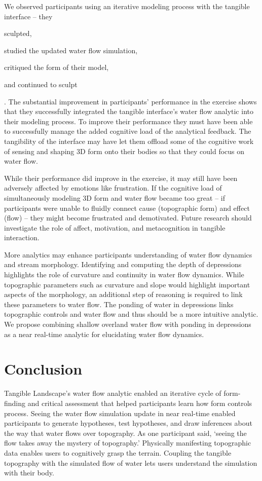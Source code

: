 \documentclass{isprs}
\begin{document}
We observed participants using an iterative modeling process with the tangible interface -- 
they 
\begin{enumerate*}[label=\alph*),font=\itshape]
\item sculpted, 
\item studied the updated water flow simulation, 
\item critiqued the form of their model, 
\item and continued to sculpt
\end{enumerate*}.
%
The substantial improvement in participants' performance in the  exercise
shows that they successfully integrated the tangible interface's water flow analytic 
into their modeling process. 
%
To improve their performance they must have been able to successfully manage the added cognitive load of the analytical feedback. 
%
The tangibility of the interface may have let them offload some of the cognitive work of sensing and shaping 3D form onto their bodies
so that they could focus on water flow. 

While their performance did improve in the  exercise, it may still have been adversely affected by emotions like frustration. 
%
If the cognitive load of simultaneously modeling 3D form and water flow became too great
-- if participants were unable to fluidly connect cause (topographic form) and effect (flow) --
they might become frustrated and demotivated. 
%
Future research should investigate the role of affect, motivation, and metacognition in tangible interaction.

More analytics may enhance participants understanding of water flow dynamics and stream morphology. 
%
Identifying and computing the depth of depressions highlights the role of curvature and continuity in water flow dynamics. 
%
While topographic parameters such as curvature and slope would highlight important aspects of the morphology, 
an additional step of reasoning is required to link these parameters to water flow. 
%
The ponding of water in depressions links topographic controls and water flow 
and thus should be a more intuitive analytic. 
%
We propose combining shallow overland water flow with ponding in depressions
as a near real-time analytic
for elucidating water flow dynamics. 

\section{Conclusion}\label{sec:conclusion}
%
Tangible Landscape's water flow analytic enabled an iterative cycle of form-finding and critical assessment that helped participants learn how form controls process. 
%
Seeing the water flow simulation update in near real-time 
enabled participants to generate hypotheses, test hypotheses, and draw inferences 
about the way that water flows over topography. 
%
As one participant said, `seeing the flow takes away the mystery of topography.' 
%
Physically manifesting topographic data enables users to cognitively grasp the terrain. 
Coupling the tangible topography with the simulated flow of water 
lets users understand the simulation with their body. 
\end{document}

